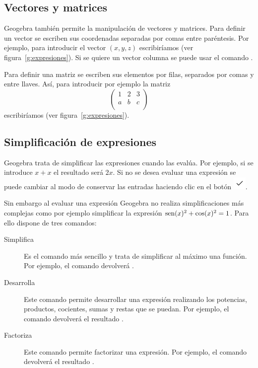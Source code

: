 \subsection*{Vectores y matrices}
Geogebra también permite la manipulación de vectores y matrices.
Para definir un vector se escriben sus coordenadas separadas por comas entre paréntesis.
Por ejemplo, para introducir el vector $(x,y,z)$ escribiríamos  (ver figura~\ref{g:expresiones}).
Si se quiere un vector columna se puede usar el comando .

Para definir una matriz se escriben sus elementos por filas, separados por comas y entre llaves.
Así, para introducir por ejemplo la matriz
\[
\left(
\begin{array}{ccc}
1 & 2 & 3 \\
a & b & c \\
\end{array}
\right)
\]
escribiríamos  (ver figura~\ref{g:expresiones}).


\subsection*{Simplificación de expresiones}
Geogebra trata de simplificar las expresiones cuando las evalúa.
Por ejemplo, si se introduce $x+x$ el resultado será $2x$.
Si no se desea evaluar una expresión se puede cambiar al modo de conservar las entradas haciendo clic en el botón \includegraphics[scale=0.03]{img/introduccion/keep-input-button}.

Sin embargo al evaluar una expresión Geogebra no realiza simplificaciones más complejas como por ejemplo simplificar la expresión $\operatorname{sen}(x)^2+\cos(x)^2=1$.
Para ello dispone de tres comandos:
\begin{description}
\item[Simplifica] Es el comando más sencillo y trata de simplificar al máximo una función.
      Por ejemplo, el comando  devolverá .
\item[Desarrolla] Este comando permite desarrollar una expresión realizando los potencias, productos, cocientes, sumas y restas que se puedan.
      Por ejemplo, el comando  devolverá el resultado .
\item[Factoriza] Este comando permite factorizar una expresión.
      Por ejemplo, el comando  devolverá el resultado .
\end{description}

